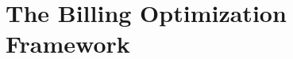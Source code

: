 \chapter{The Billing Optimization Framework}\label{ch:the-billing-optimization-framework}

%
%
%
%

%
%
%
%
%




